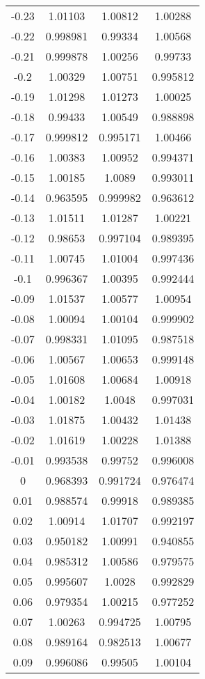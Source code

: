 \begin{table}[h!]
\begin{tabular}{|c|c|c|c|}
-0.23 & 1.01103 & 1.00812 & 1.00288 \\
-0.22 & 0.998981 & 0.99334 & 1.00568 \\
-0.21 & 0.999878 & 1.00256 & 0.99733 \\
-0.2 & 1.00329 & 1.00751 & 0.995812 \\
-0.19 & 1.01298 & 1.01273 & 1.00025 \\
-0.18 & 0.99433 & 1.00549 & 0.988898 \\
-0.17 & 0.999812 & 0.995171 & 1.00466 \\
-0.16 & 1.00383 & 1.00952 & 0.994371 \\
-0.15 & 1.00185 & 1.0089 & 0.993011 \\
-0.14 & 0.963595 & 0.999982 & 0.963612 \\
-0.13 & 1.01511 & 1.01287 & 1.00221 \\
-0.12 & 0.98653 & 0.997104 & 0.989395 \\
-0.11 & 1.00745 & 1.01004 & 0.997436 \\
-0.1 & 0.996367 & 1.00395 & 0.992444 \\
-0.09 & 1.01537 & 1.00577 & 1.00954 \\
-0.08 & 1.00094 & 1.00104 & 0.999902 \\
-0.07 & 0.998331 & 1.01095 & 0.987518 \\
-0.06 & 1.00567 & 1.00653 & 0.999148 \\
-0.05 & 1.01608 & 1.00684 & 1.00918 \\
-0.04 & 1.00182 & 1.0048 & 0.997031 \\
-0.03 & 1.01875 & 1.00432 & 1.01438 \\
-0.02 & 1.01619 & 1.00228 & 1.01388 \\
-0.01 & 0.993538 & 0.99752 & 0.996008 \\
0 & 0.968393 & 0.991724 & 0.976474 \\
0.01 & 0.988574 & 0.99918 & 0.989385 \\
0.02 & 1.00914 & 1.01707 & 0.992197 \\
0.03 & 0.950182 & 1.00991 & 0.940855 \\
0.04 & 0.985312 & 1.00586 & 0.979575 \\
0.05 & 0.995607 & 1.0028 & 0.992829 \\
0.06 & 0.979354 & 1.00215 & 0.977252 \\
0.07 & 1.00263 & 0.994725 & 1.00795 \\
0.08 & 0.989164 & 0.982513 & 1.00677 \\
0.09 & 0.996086 & 0.99505 & 1.00104 \\

\end{tabular}
\end{table}
